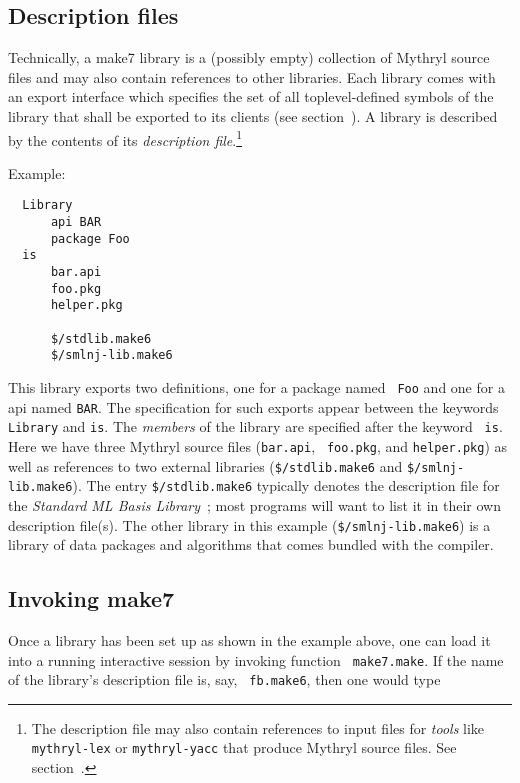 \subsection{Description files}

Technically, a make7 library is a (possibly empty) collection of Mythryl
source files and may also contain references to other libraries.  Each
library comes with an export interface which specifies the set of all
toplevel-defined symbols of the library that shall be exported to its
clients (see section~).  A library is
described by the contents of its {\em description file}.\footnote{The
description file may also contain references to input files for {\em
tools} like {\tt mythryl-lex} or {\tt mythryl-yacc} that produce Mythryl source
files.  See section~.}

\noindent Example:

\begin{verbatim}
  Library
      api BAR
      package Foo
  is
      bar.api
      foo.pkg
      helper.pkg

      $/stdlib.make6
      $/smlnj-lib.make6
\end{verbatim}

This library exports two definitions, one for a package named {\tt
Foo} and one for a api named {\tt BAR}.  The specification for
such exports appear between the keywords {\tt Library} and {\tt is}.
The {\em members} of the library are specified after the keyword {\tt
is}.  Here we have three Mythryl source files ({\tt bar.api}, {\tt
foo.pkg}, and {\tt helper.pkg}) as well as references to two external
libraries ({\tt \$/stdlib.make6} and {\tt \$/smlnj-lib.make6}).  The entry
{\tt \$/stdlib.make6} typically denotes the description file for the {\it
Standard ML Basis Library}~\cite{reppy99:basis}; most programs will
want to list it in their own description file(s).  The other library
in this example ({\tt \$/smlnj-lib.make6}) is a library of data
packages and algorithms that comes bundled with the compiler.

\subsection{Invoking make7}

Once a library has been set up as shown in the example above, one can
load it into a running interactive session by invoking function {\tt
make7.make}.  If the name of the library's description file is, say, {\tt
fb.make6}, then one would type

